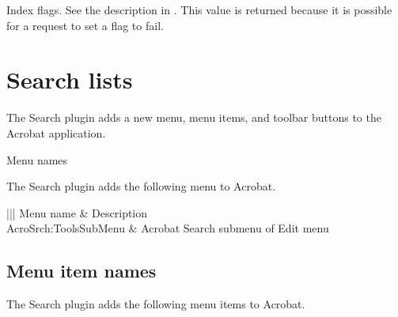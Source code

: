 \documentclass[letterpaper,12pt,english,openany,oneside]{sphinxmanual}
\begin{document}

\begin{sphinxVerbatim}[commandchars=\\\{\}]
  
\end{sphinxVerbatim}

Index flags. See the description in . This value is returned because it is possible for a request to set a flag to fail.




\section{Search lists}
\label{\detokenize{IAC_API_SearchIntro:search-lists}}
The Search plug\sphinxhyphen{}in adds a new menu, menu items, and toolbar buttons to the Acrobat application.



Menu names

The Search plug\sphinxhyphen{}in adds the following menu to Acrobat.


\begin{savenotes}\sphinxattablestart
\centering
{}\label{\detokenize{IAC_API_SearchIntro:section-16}}\nobreak
\begin{tabular}[t]{|||}
\hline
\sphinxstyletheadfamily 
Menu name
&\sphinxstyletheadfamily 
Description
\\
\hline
AcroSrch:ToolsSubMenu
&
Acrobat Search submenu of Edit menu
\\
\hline
\end{tabular}
\par
\sphinxattableend\end{savenotes}


\subsection{Menu item names}
\label{\detokenize{IAC_API_SearchIntro:menu-item-names}}
The Search plug\sphinxhyphen{}in adds the following menu items to Acrobat.
\end{document}
